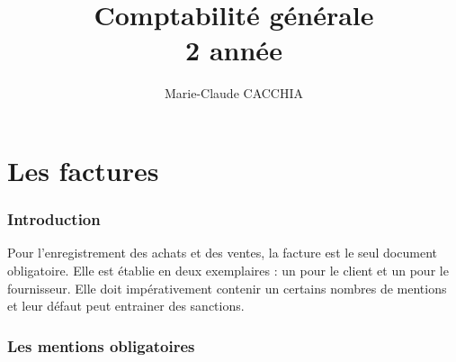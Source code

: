 \documentclass[11pt]{article}
\begin{document}
    \title{Comptabilité générale\\\small{2 année}}
    \author{Marie-Claude CACCHIA}
    \date{}

\maketitle
\setcounter{page}{0} \thispagestyle{empty} %

\newpage
\part{Les factures}
	\section{Introduction}
		Pour l'enregistrement des achats et des ventes, la facture est le seul document obligatoire. Elle est établie en deux exemplaires : un pour le client et un pour le fournisseur. Elle doit impérativement contenir un certains nombres de mentions et leur défaut peut entrainer des sanctions.
		
	\section{Les mentions obligatoires}
\end{document}
